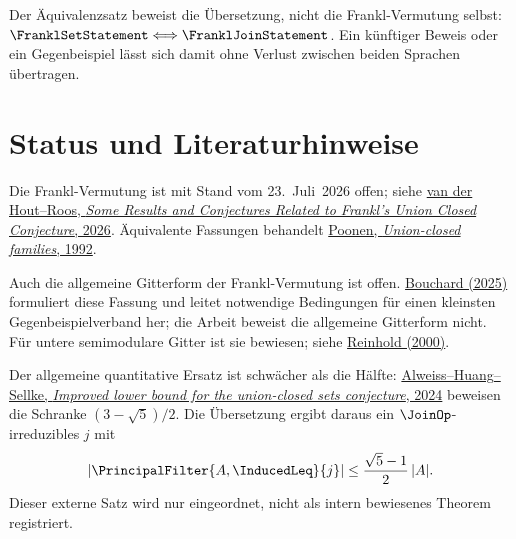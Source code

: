 \documentclass[main.tex]{subfiles}
\begin{document}
\begin{tabproofsplitwide}
  \closeproofpartwide
\end{tabproofsplitwide}

Der Äquivalenzsatz beweist die Übersetzung, nicht die Frankl-Vermutung selbst:
\(\FranklSetStatement\Longleftrightarrow\FranklJoinStatement\).
Ein künftiger Beweis oder ein Gegenbeispiel lässt sich damit ohne Verlust
zwischen beiden Sprachen übertragen.

\section{Status und Literaturhinweise}

Die Frankl-Vermutung ist mit Stand vom 23.~Juli~2026 offen; siehe
\href{https://doi.org/10.23952/jano.8.2026.1.02}%
  {van der Hout--Roos, \emph{Some Results and Conjectures Related to
  Frankl's Union Closed Conjecture}, 2026}.
Äquivalente Fassungen behandelt
\href{https://doi.org/10.1016/0097-3165(92)90068-6}%
  {Poonen, \emph{Union-closed families}, 1992}.

Auch die allgemeine Gitterform der Frankl-Vermutung ist offen.
\href{https://arxiv.org/abs/2503.00277}%
  {Bouchard (2025)} formuliert diese Fassung und leitet notwendige Bedingungen
für einen kleinsten Gegenbeispielverband her; die Arbeit beweist die allgemeine
Gitterform nicht. Für untere semimodulare Gitter ist sie bewiesen; siehe
\href{https://doi.org/10.1007/s003730050008}%
  {Reinhold (2000)}.

\begin{remark}
Der allgemeine quantitative Ersatz ist schwächer als die Hälfte:
\href{https://doi.org/10.37236/12232}%
  {Alweiss--Huang--Sellke, \emph{Improved lower bound for the union-closed
  sets conjecture}, 2024} beweisen die Schranke \((3-\sqrt5)/2\).
Die Übersetzung ergibt daraus ein \(\JoinOp\)-irreduzibles \(j\) mit
\[
  \lvert\PrincipalFilter{A,\InducedLeq}{j}\rvert
  \leq \frac{\sqrt5-1}{2}\,\lvert A\rvert.
\]
Dieser externe Satz wird nur eingeordnet, nicht als intern bewiesenes Theorem
registriert.
\end{remark}
\end{document}
